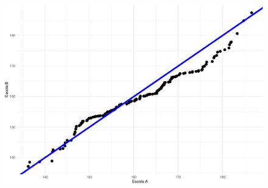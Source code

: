 \documentclass[
  10pt,
  ignorenonframetext,
]{beamer}
\begin{document}
\begin{frame}
\begin{figure}

{\centering \includegraphics[width=1\textwidth,height=\textheight]{exploracao-visualizacao_files/figure-beamer/unnamed-chunk-121-1.pdf}

}

\end{figure}
\end{frame}
\end{document}
